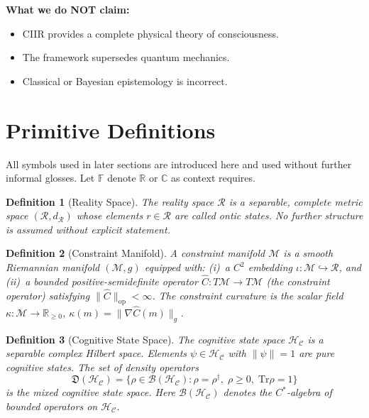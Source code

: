 \documentclass[twocolumn,aps,prd,superscriptaddress,nofootinbib]{revtex4-2}
\newtheorem{definition}{Definition}[section]
\newcommand{\HC}{\mathcal{H}_{\mathcal{C}}}
\newcommand{\CR}{\mathcal{R}}
\newcommand{\CM}{\mathcal{M}}
\newcommand{\CB}{\mathcal{B}}
\newcommand{\hatC}{\hat{C}}
\newcommand{\Tr}{\mathrm{Tr}}
\begin{document}
\textbf{What we do NOT claim:}
\begin{itemize}
    \item CIIR provides a complete physical theory of consciousness.
    \item The framework supersedes quantum mechanics.
    \item Classical or Bayesian epistemology is incorrect.
\end{itemize}

\section{Primitive Definitions}
\label{sec:primitives}

All symbols used in later sections are introduced here and used without
further informal glosses.  Let $\mathbb{F}$ denote $\mathbb{R}$ or
$\mathbb{C}$ as context requires.

\begin{definition}[Reality Space]
\label{def:reality}
The \emph{reality space} $\CR$ is a separable, complete metric space
$(\CR, d_{\CR})$ whose elements $r \in \CR$ are called \emph{ontic states}.
No further structure is assumed without explicit statement.
\end{definition}

\begin{definition}[Constraint Manifold]
\label{def:constraint}
A \emph{constraint manifold} $\CM$ is a smooth Riemannian manifold
$(\CM, g)$ equipped with:
(i)~a $C^2$ embedding $\iota : \CM \hookrightarrow \CR$, and
(ii)~a bounded positive-semidefinite operator
     $\hatC : T\CM \to T\CM$ (the \emph{constraint operator}) satisfying
     $\|\hatC\|_{\mathrm{op}} < \infty$.
The \emph{constraint curvature} is the scalar field
$\kappa : \CM \to \mathbb{R}_{\geq 0}$, $\kappa(m) = \|\nabla \hatC(m)\|_{g}$.
\end{definition}

\begin{definition}[Cognitive State Space]
\label{def:cognitive}
The \emph{cognitive state space} $\HC$ is a separable complex Hilbert space.
Elements $\psi \in \HC$ with $\|\psi\| = 1$ are \emph{pure cognitive states}.
The set of \emph{density operators}
\[
  \mathfrak{D}(\HC) = \bigl\{\rho \in \CB(\HC) :
    \rho = \rho^\dagger,\; \rho \geq 0,\; \Tr\rho = 1 \bigr\}
\]
is the \emph{mixed cognitive state space}.  Here $\CB(\HC)$ denotes the
$C^*$-algebra of bounded operators on $\HC$.
\end{definition}
\end{document}
